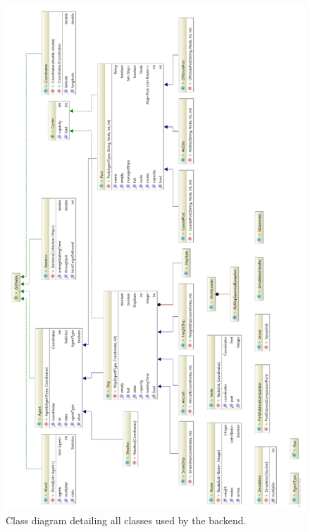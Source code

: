 \newpage
\begin{figure}[h!]
	\centering
	\includegraphics[height=0.93\textheight]{images/class_diagram}
	\caption{Class diagram detailing all classes used by the backend.}
	\label{fig:class_diagram}
\end{figure}



